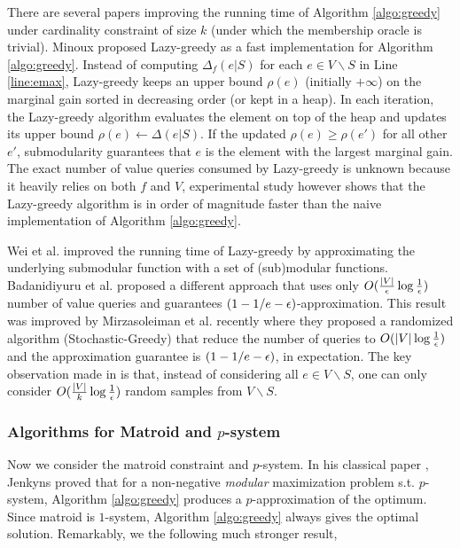 There are several papers improving the running time of Algorithm \ref{algo:greedy} under cardinality constraint of size $k$ (under which the membership oracle is trivial). Minoux \cite{M78} proposed {\sc Lazy-greedy} as a fast implementation for Algorithm \ref{algo:greedy}. Instead of computing $\Delta_f(e|S)$ for each $e\in V\backslash S$ in Line \ref{line:emax},  {\sc Lazy-greedy} keeps an upper bound $\rho(e)$ (initially $+\infty$) on the marginal gain sorted in decreasing order (or kept in a heap). In each iteration, the {\sc Lazy-greedy} algorithm evaluates the element on top of the heap and updates its upper bound $\rho(e) \gets \Delta(e|S)$. If the updated $\rho(e) \geq \rho(e')$ for all other $e'$, submodularity guarantees that $e$ is the element with the largest marginal gain. The exact number of value queries consumed by {\sc Lazy-greedy} is unknown because it heavily relies on both $f$ and $V$, experimental study however shows that the {\sc Lazy-greedy} algorithm is in order of magnitude faster than the naive implementation of Algorithm \ref{algo:greedy}.  

Wei et al. \cite{WIB14} improved the running time of {\sc Lazy-greedy} by approximating the underlying submodular function with a set of (sub)modular functions. Badanidiyuru et al. \cite{BV14} proposed a different approach that uses only $O(\frac{|V|}{\epsilon}\log \frac{1}{\epsilon})$ number of value queries and guarantees $(1 - 1/e - \epsilon)$-approximation. This result was improved by Mirzasoleiman et al. \cite{MBK+15} recently where they proposed a randomized algorithm ({\sc Stochastic-Greedy}) that reduce the number of queries to  $O(|V| \log \frac{1}{\epsilon})$ and the approximation guarantee is $(1 - 1/e - \epsilon)$, in expectation. The key observation made in \cite{MBK+15} is that, instead of considering all $e\in V\backslash S$, one can only consider $O(\frac{|V|}{k}\log \frac{1}{\epsilon})$  random samples from $V\backslash S$. 



 







\subsubsection{Algorithms for Matroid and $p$-system}
Now we consider the matroid constraint and $p$-system. In his classical paper \cite{J76}, Jenkyns proved that for a non-negative \emph{modular} maximization problem s.t. $p$-system, Algorithm \ref{algo:greedy} produces a $p$-approximation of the optimum. Since matroid is $1$-system, Algorithm \ref{algo:greedy} always gives the optimal solution. Remarkably, we the following much stronger result, 

